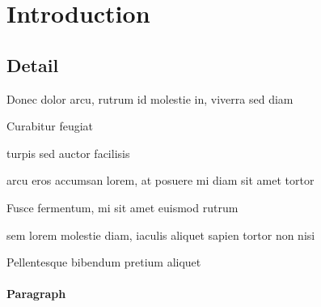 






\maketitle %




\newpage
\tableofcontents \thispagestyle{empty} 

\newpage




\section{Introduction}\label{sec:intro}
\lipsum*[2-3] %

\subsection{Detail}

\begin{compactitem}
	\item Donec dolor arcu, rutrum id molestie in, viverra sed diam
	\item Curabitur feugiat
	\item turpis sed auctor facilisis
	\item arcu eros accumsan lorem, at posuere mi diam sit amet tortor
	\item Fusce fermentum, mi sit amet euismod rutrum
	\item sem lorem molestie diam, iaculis aliquet sapien tortor non nisi
	\item Pellentesque bibendum pretium aliquet
\end{compactitem}
\lipsum[4] %

\paragraph{Paragraph}
\lipsum[75]

